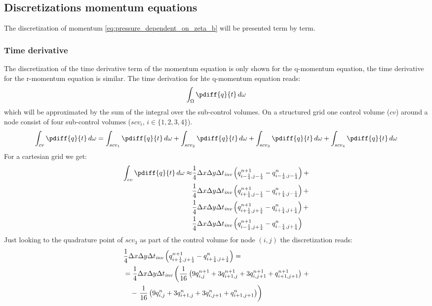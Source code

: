 \subsection{Discretizations momentum equations}
The discretization of momentum \autoref{eq:pressure_dependent_on_zeta_b} will be presented term by term.
\subsubsection{Time derivative}
The discretization of the time derivative term of the momentum equation is only shown for the q-momentum equation, the time derivative for the r-momentum equation is similar. The time derivation for hte q-momentum equation reads:
\begin{align}
    \int_{\Omega} \pdiff{q}{t}\, d\omega
\end{align}
which will be approximated by the sum of the integral over the sub-control volumes.
On a structured grid one control volume ($cv$) around a node consist of four sub-control volumes ($scv_i$, $i\in\{1,2,3,4\}$).
\begin{align}
    \int_{cv} \pdiff{q}{t}\, d\omega =
    \int_{scv_1} \pdiff{q}{t}\, d\omega +
    \int_{scv_2} \pdiff{q}{t}\, d\omega +
    \int_{scv_3} \pdiff{q}{t}\, d\omega +
    \int_{scv_4} \pdiff{q}{t}\, d\omega
\end{align}
For a cartesian grid we get:
\begin{align}
    \int_{cv} \pdiff{q}{t}\, d\omega \approx &
    \quart\Dx\Dy\Dtinv \left( q^{n+1}_{i-\quart, j-\quart} -  q^{n}_{i-\quart, j-\quart} \right) +
    \nonumber \\*
    &\quart\Dx\Dy\Dtinv \left( q^{n+1}_{i+\quart, j-\quart} -  q^{n}_{i+\quart, j-\quart} \right) +
    \nonumber \\*
    &\quart\Dx\Dy\Dtinv \left( q^{n+1}_{i+\quart, j+\quart} -  q^{n}_{i+\quart, j+\quart} \right) +
    \nonumber \\*
    &\quart\Dx\Dy\Dtinv \left( q^{n+1}_{i-\quart, j+\quart} -  q^{n}_{i-\quart, j+\quart} \right)
\end{align}
Just looking to the quadrature point of $scv_3$ as part of the control volume for node $(i,j)$ the discretization reads:
\begin{align}
    &\frac{1}{4}\Delta x\Delta y\Delta t_{\it{inv}} \left( q^{n+1}_{i+\frac{1}{4}, j+\frac{1}{4}} -  q^{n}_{i+\frac{1}{4}, j+\frac{1}{4}} \right) =
    \\*
    &= \frac{1}{4}\Delta x\Delta y\Delta t_{\it{inv}} \left( \frac{1}{16}\left( 9 q^{n+1}_{i, j} + 3 q^{n+1}_{i+1,j}  + 3 q^{n+1}_{i, j+1} + q^{n+1}_{i+1, j+1}\right) \right. +
    \\*
    &\quad - \left. \frac{1}{16}\left( 9 q^{n}_{i, j} +  3 q^{n}_{i+1,j}  + 3  q^{n}_{i, j+1} + q^{n}_{i+1, j+1}\right)\right)
\end{align}
